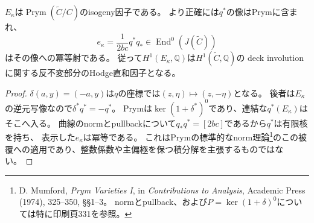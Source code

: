 \begin{corollary}[楕円曲線のPrym因子]
\label{cor:elliptic-prym-factor}
$E_\kappa$は$\operatorname{Prym}(\widetilde C/C)$のisogeny因子である。
より正確には$q^*$の像はPrymに含まれ、
\[
 e_\kappa=\frac{1}{2bc}q^*q_*
 \in\operatorname{End}^0(J(\widetilde C))
\]
はその像への冪等射である。
従って$H^1(E_\kappa,\mathbb Q)$は$H^1(\widetilde C,\mathbb Q)$の
deck involutionに関する反不変部分のHodge直和因子となる。
\end{corollary}
\begin{proof}
$\delta(a,y)=(-a,y)$は$q$の座標では$(z,\eta)\mapsto(z,-\eta)$となる。
後者は$E_\kappa$の逆元写像なので$\delta^*q^*=-q^*$。
Prymは$\ker(1+\delta^*)^0$であり、連結な$q^*(E_\kappa)$はそこへ入る。
曲線のnormとpullbackについて$q_*q^*=[2bc]$であるから$q^*$は有限核を持ち、
表示した$e_\kappa$は冪等である。
これはPrymの標準的なnorm理論\footnote{
D. Mumford, \emph{Prym Varieties I}, in \emph{Contributions to Analysis},
Academic Press (1974), 325--350, \S\S1--3。
normとpullback、および$P=\ker(1+\delta)^0$については特に印刷頁331を参照。
}のこの被覆への適用であり、整数係数や主偏極を保つ積分解を主張するものではない。
\end{proof}

